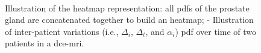 \begin{figure}
  \centering
  \hspace*{\fill}
   \hfill
  \hspace*{\fill}
  \\
  \hspace*{\fill}
   \hfill
   \hfill
  \hspace*{\fill}
  \caption{ Illustration of the heatmap representation: all \ac*{pdf}s of the prostate gland are concatenated together to build an heatmap; - Illustration of inter-patient variations (i.e., $\Delta_i$, $\Delta_t$, and $\alpha_i$) \acs*{pdf} over time of two patients in a \ac{dce}-\ac{mri}.}
  \label{fig:heatmap}
\end{figure}

